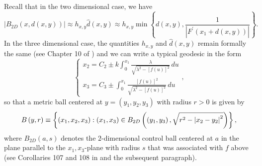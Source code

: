 \documentclass{amsart}
\theoremstyle{plain}
\numberwithin{equation}{section}
\begin{document}
Recall that in the two dimensional case, we have%
\begin{equation*}
\left\vert B_{2D}\left( x,d\left( x,y\right) \right) \right\vert \approx
h_{x,y}\widehat{d}\left( x,y\right) \approx h_{x,y}\min \left\{ d\left(
x,y\right) ,\frac{1}{\left\vert F^{\prime }\left( x_{1}+d\left( x,y\right)
	\right) \right\vert }\right\} .
\end{equation*}%
In the three dimensional case, the quantities $h_{x,y}$ and $\widehat{d}%
\left( x,y\right) $ remain formally the same (see Chapter 10 of \cite%
{KoRiSaSh1}) and we can write a typical geodesic in the form 
\begin{equation*}
\left\{ 
\begin{array}{l}
x_{2}=C_{2}\pm k\int_{0}^{x_{1}}\frac{\lambda }{\sqrt{\lambda ^{2}-[f(u)]^{2}%
}}\,du \\ 
x_{3}=C_{3}\pm \int_{0}^{x_{1}}\frac{[f(u)]^{2}}{\sqrt{\lambda
		^{2}-[f(u)]^{2}}}\,du%
\end{array}%
\right. ,
\end{equation*}%
so that a metric ball centered at $y=\left( y_{1},y_{2},y_{3}\right) $ with
radius $r>0$ is given by 
\begin{equation*}
B\left( y,r\right) \equiv \left\{ \left( x_{1},x_{2},x_{3}\right) :\left(
x_{1},x_{3}\right) \in B_{2D}\left( \left( y_{1},y_{3}\right) ,\sqrt{%
	r^{2}-\left\vert x_{2}-y_{2}\right\vert ^{2}}\right) \right\} ,
\end{equation*}%
where $B_{2D}\left( a,s\right) $ denotes the $2$-dimensional control ball
centered at $a$ in the plane parallel to the $x_{1},x_{3}$-plane with radius 
$s$ that was associated with $f$ above (see Corollaries 107 and 108 in \cite%
{KoRiSaSh1} and the subsequent paragraph).
\end{document}
